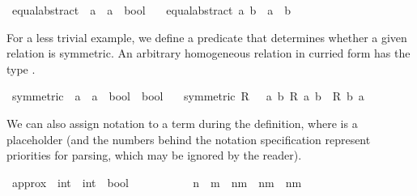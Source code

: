 \begin{isabellebody}
\begin{isamarkuptext}
\end{isamarkuptext}\isamarkuptrue%
\isamarkupfalse%
\ equal{\isacharunderscore}{\kern0pt}abstract\ {\isacharcolon}{\kern0pt}{\isacharcolon}{\kern0pt}\ {\isacartoucheopen}{\isacharprime}{\kern0pt}a\ {\isasymRightarrow}\ {\isacharprime}{\kern0pt}a\ {\isasymRightarrow}\ bool{\isacartoucheclose}\isanewline
\ \ \ {\isacartoucheopen}equal{\isacharunderscore}{\kern0pt}abstract\ a\ b\ {\isasymequiv}\ a\ {\isacharequal}{\kern0pt}\ b{\isacartoucheclose}%
\begin{isamarkuptext}%
For a less trivial example, we define a predicate  that determines whether a given relation is symmetric. An arbitrary homogeneous relation in curried form has the type .%
\end{isamarkuptext}\isamarkuptrue%
\isamarkupfalse%
\ symmetric\ {\isacharcolon}{\kern0pt}{\isacharcolon}{\kern0pt}\ {\isacartoucheopen}{\isacharparenleft}{\kern0pt}{\isacharprime}{\kern0pt}a\ {\isasymRightarrow}\ {\isacharprime}{\kern0pt}a\ {\isasymRightarrow}\ bool{\isacharparenright}{\kern0pt}\ {\isasymRightarrow}\ bool{\isacartoucheclose}\isanewline
\ \ \ {\isacartoucheopen}symmetric\ R\ {\isasymequiv}\ {\isasymforall}\ a\ b{\isachardot}{\kern0pt}\ R\ a\ b\ {\isasymlongrightarrow}\ R\ b\ a{\isacartoucheclose}%
\begin{isamarkuptext}%
We can also assign notation to a term during the definition, where \isa{{\isacharunderscore}{\kern0pt}} is a placeholder (and the numbers behind the notation specification represent priorities for parsing, which may be ignored by the reader).%
\end{isamarkuptext}\isamarkuptrue%
\isamarkupfalse%
\ approx\ {\isacharcolon}{\kern0pt}{\isacharcolon}{\kern0pt}\ {\isacartoucheopen}int\ {\isasymRightarrow}\ int\ {\isasymRightarrow}\ bool{\isacartoucheclose}\isanewline
\ \ {\isacharparenleft}{\kern0pt}{\isacartoucheopen}{\isacharunderscore}{\kern0pt}\ {\isasymapprox}\ {\isacharunderscore}{\kern0pt}{\isacartoucheclose}\ {\isacharbrackleft}{\kern0pt}{}{}{\isacharcomma}{\kern0pt}\ {}{}{\isacharbrackright}{\kern0pt}\ {}{}{\isacharparenright}{\kern0pt}\isanewline
\ \ \ {\isacartoucheopen}n\ {\isasymapprox}\ m\ {\isasymequiv}\ n{\isacharequal}{\kern0pt}m{\isacharminus}{\kern0pt}{}\ {\isasymor}\ n{\isacharequal}{\kern0pt}m\ {\isasymor}\ n{\isacharequal}{\kern0pt}m{\isacharplus}{\kern0pt}{}{\isacartoucheclose}%

\end{isabellebody}
